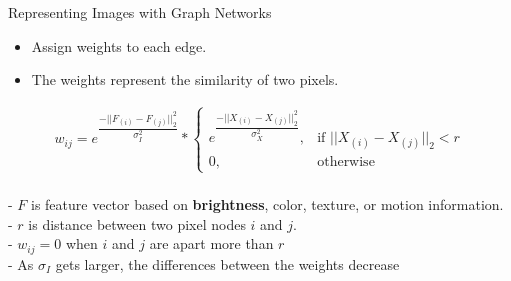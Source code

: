 \documentclass[10pt,xcolor=svgnames]{beamer} %
\begin{document}
\begin{frame}{Representing Images with Graph Networks}
\begin{itemize}
    \item Assign weights to each edge.
    \item The weights represent the similarity of two pixels.
\end{itemize}
\begin{align}
w_{ij} = e^{\dfrac{-||F_{(i)} - F_{(j)}||_2^2}{\sigma_I^2}}
*
    \begin{cases}
    e^\dfrac{-||X_{(i)} - X_{(j)}||_2^2}{\sigma_X^2}, &  \text{if } ||X_{(i)} - X_{(j)}||_2 < r\\
    0,                                               &  \text{otherwise}
    \end{cases}
\end{align}
\\
  \pause
  -   $F$ is feature vector based on \textbf{brightness}, color, texture, or motion information. \\
  \pause
  -   $r$ is distance between two pixel nodes $i$ and $j$. \\ 
  -   $w_{ij} = 0$ when $i$ and $j$ are apart more than $r$ \\
  -   As $\sigma_I$ gets larger, the differences between the weights decrease \\
\end{frame}
\end{document}
